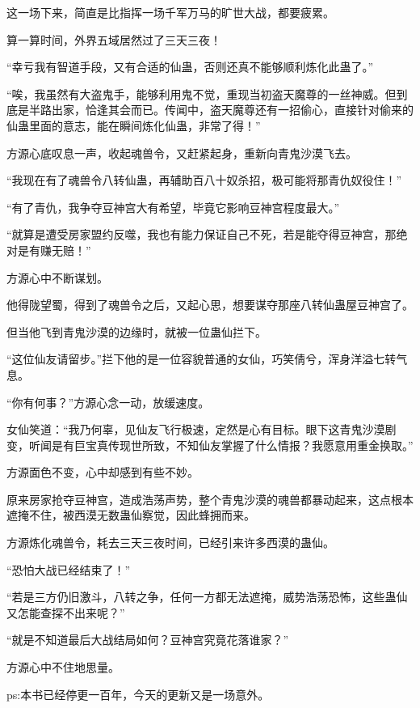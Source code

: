 \begin{this_body}
这一场下来，简直是比指挥一场千军万马的旷世大战，都要疲累。

算一算时间，外界五域居然过了三天三夜！

“幸亏我有智道手段，又有合适的仙蛊，否则还真不能够顺利炼化此蛊了。”

“唉，我虽然有大盗鬼手，能够利用鬼不觉，重现当初盗天魔尊的一丝神威。但到底是半路出家，恰逢其会而已。传闻中，盗天魔尊还有一招偷心，直接针对偷来的仙蛊里面的意志，能在瞬间炼化仙蛊，非常了得！”

方源心底叹息一声，收起魂兽令，又赶紧起身，重新向青鬼沙漠飞去。

“我现在有了魂兽令八转仙蛊，再辅助百八十奴杀招，极可能将那青仇奴役住！”

“有了青仇，我争夺豆神宫大有希望，毕竟它影响豆神宫程度最大。”

“就算是遭受房家盟约反噬，我也有能力保证自己不死，若是能夺得豆神宫，那绝对是有赚无赔！”

方源心中不断谋划。

他得陇望蜀，得到了魂兽令之后，又起心思，想要谋夺那座八转仙蛊屋豆神宫了。

但当他飞到青鬼沙漠的边缘时，就被一位蛊仙拦下。

“这位仙友请留步。”拦下他的是一位容貌普通的女仙，巧笑倩兮，浑身洋溢七转气息。

“你有何事？”方源心念一动，放缓速度。

女仙笑道：“我乃何辜，见仙友飞行极速，定然是心有目标。眼下这青鬼沙漠剧变，听闻是有巨宝真传现世所致，不知仙友掌握了什么情报？我愿意用重金换取。”

方源面色不变，心中却感到有些不妙。

原来房家抢夺豆神宫，造成浩荡声势，整个青鬼沙漠的魂兽都暴动起来，这点根本遮掩不住，被西漠无数蛊仙察觉，因此蜂拥而来。

方源炼化魂兽令，耗去三天三夜时间，已经引来许多西漠的蛊仙。

“恐怕大战已经结束了！”

“若是三方仍旧激斗，八转之争，任何一方都无法遮掩，威势浩荡恐怖，这些蛊仙又怎能查探不出来呢？”

“就是不知道最后大战结局如何？豆神宫究竟花落谁家？”

方源心中不住地思量。

ps:本书已经停更一百年，今天的更新又是一场意外。

\end{this_body}

